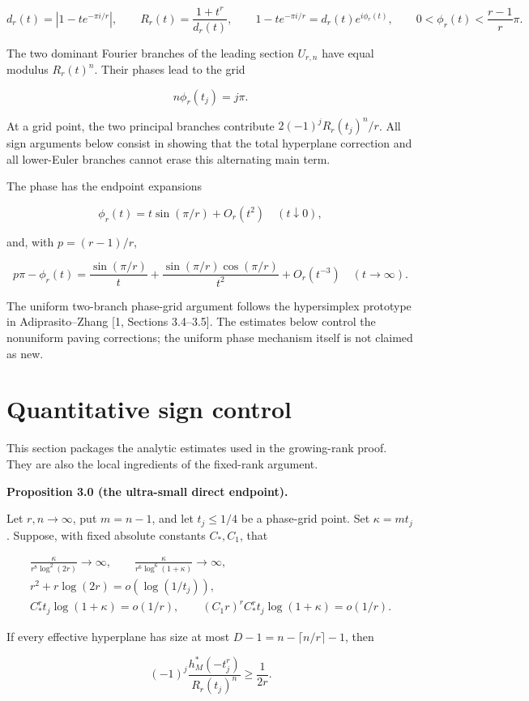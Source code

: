 \documentclass[10pt]{article}
\newenvironment{mdstatement}[1]
  {\par\Needspace{0.16\textheight}\noindent\textbf{#1.}\ \itshape}
  {\par\normalfont}
\begin{document}
\[
 d_r(t)=|1-te^{-\pi i/r}|,
 \qquad R_r(t)=\frac{1+t^r}{d_r(t)},
 \qquad
 1-te^{-\pi i/r}=d_r(t)e^{i\phi_r(t)},
 \qquad 0<\phi_r(t)<\frac{r-1}{r}\pi. \tag{2.11}
\]

The two dominant Fourier branches of the leading section $U_{r,n}$ have equal
modulus $R_r(t)^n$.  Their phases lead to the grid

\[
 n\phi_r(t_j)=j\pi. \tag{2.12}
\]

At a grid point, the two principal branches contribute
$2(-1)^jR_r(t_j)^n/r$.  All sign arguments below consist in showing that
the total hyperplane correction and all lower-Euler branches cannot erase
this alternating main term.

The phase has the endpoint expansions

\[
 \phi_r(t)=t\sin(\pi/r)+O_r(t^2)\quad(t\downarrow0), \tag{2.13}
\]

and, with $p=(r-1)/r$,

\[
 p\pi-\phi_r(t)=\frac{\sin(\pi/r)}t
 +\frac{\sin(\pi/r)\cos(\pi/r)}{t^2}
 +O_r(t^{-3})\quad(t\to\infty). \tag{2.14}
\]

The uniform two-branch phase-grid argument follows the hypersimplex prototype
in Adiprasito--Zhang [1, Sections 3.4--3.5].  The estimates below control the
nonuniform paving corrections; the uniform phase mechanism itself is not
claimed as new.

\section{Quantitative sign control}


This section packages the analytic estimates used in the growing-rank proof.
They are also the local ingredients of the fixed-rank argument.

\begin{mdstatement}{Proposition 3.0 (the ultra-small direct endpoint)}


Let $r,n\to\infty$, put $m=n-1$, and let $t_j\le1/4$ be a phase-grid
point.  Set $\kappa=mt_j$.  Suppose, with fixed absolute constants
$C_*,C_1$, that

\[
 \begin{gathered}
 \frac{\kappa}{r^8\log^2(2r)}\longrightarrow\infty,
 \qquad
 \frac{\kappa}{r^6\log^6(1+\kappa)}\longrightarrow\infty,\\
 r^2+r\log(2r)=o(\log(1/t_j)),\\
 C_*^rt_j\log(1+\kappa)=o(1/r),\qquad
 (C_1r)^rC_*^rt_j\log(1+\kappa)=o(1/r).
 \end{gathered} \tag{3.0}
\]

If every effective hyperplane has size at most
$D-1=n-\lceil n/r\rceil-1$, then

\[
 (-1)^j\frac{h_M^*(-t_j^r)}{R_r(t_j)^n}\ge\frac1{2r}. \tag{3.0a}
\]

\end{mdstatement}
\end{document}
